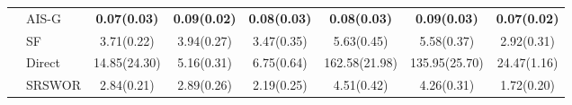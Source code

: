 \begin{tabular}{llcccccc}
                         & AIS-G                 & \textbf{0.07(0.03)}   & \textbf{0.09(0.02)}   & \textbf{0.08(0.03)}   & \textbf{0.08(0.03)}   & \textbf{0.09(0.03)}   & \textbf{0.07(0.02)}   \\
                         & SF                    & {3.71(0.22)}          & {3.94(0.27)}          & {3.47(0.35)}          & {5.63(0.45)}          & {5.58(0.37)}          & {2.92(0.31)}          \\
                         & Direct                & {14.85(24.30)}        & {5.16(0.31)}          & {6.75(0.64)}          & {162.58(21.98)}       & {135.95(25.70)}       & {24.47(1.16)}         \\
                         & SRSWOR                & {2.84(0.21)}          & {2.89(0.26)}          & {2.19(0.25)}          & {4.51(0.42)}          & {4.26(0.31)}          & {1.72(0.20)}          \\
  \bottomrule
\end{tabular}
